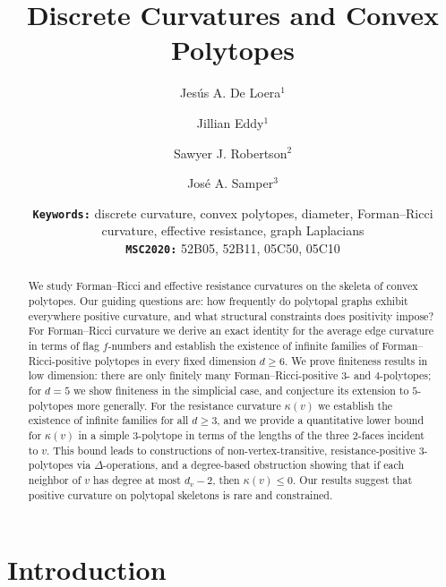 \documentclass[11pt,a4paper]{amsart}
\date{\textbf{\texttt{Keywords:}} discrete curvature, convex polytopes, diameter, Forman--Ricci curvature, effective resistance, graph Laplacians
\\
\hspace*{.225in}\textbf{\texttt{MSC2020:}} 52B05, 52B11, 05C50, 05C10}
\title{Discrete Curvatures and Convex Polytopes}
\author{Jes\'us A. De Loera$^1$}
\author{Jillian Eddy$^1$}
\author{Sawyer J. Robertson$^2$}
\author{Jos\'e A. Samper$^3$}
\begin{document}

    \begin{abstract}
        We study Forman--Ricci and effective resistance curvatures on the skeleta of convex polytopes. Our guiding questions are: how frequently do polytopal graphs exhibit everywhere positive curvature, and what structural constraints does positivity impose? For Forman--Ricci curvature we derive an exact identity for the average edge curvature in terms of flag $f$-numbers and establish the existence of infinite families of Forman--Ricci-positive polytopes in every fixed dimension $d\ge 6$. We prove finiteness results in low dimension: there are only finitely many Forman--Ricci-positive $3$- and $4$-polytopes; for $d=5$ we show finiteness in the simplicial case, and conjecture its extension to $5$-polytopes more generally. For the resistance curvature $\kappa(v)$ we establish the existence of infinite families for all $d\ge 3$, and we provide a quantitative lower bound for $\kappa(v)$ in a simple $3$-polytope in terms of the lengths of the three $2$-faces incident to $v$. This bound leads to constructions of non-vertex-transitive, resistance-positive $3$-polytopes via $\Delta$-operations, and a degree-based obstruction showing that if each neighbor of $v$ has degree at most $d_v-2$, then $\kappa(v)\le 0$. Our results suggest that positive curvature on polytopal skeletons is rare and constrained. 
    \end{abstract}

	\maketitle

\section{Introduction}
\end{document}
